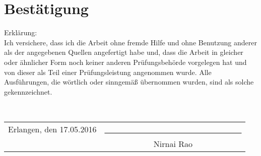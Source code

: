 \chapter*{Best\"atigung}\thispagestyle{empty}
\label{sec:Bestaetigung}

\vspace*{2cm}
Erklärung:
~\\
Ich versichere, dass ich die Arbeit ohne fremde Hilfe und ohne Benutzung anderer als der angegebenen Quellen angefertigt habe und, dass die Arbeit in gleicher oder ähnlicher Form noch keiner anderen Prüfungsbehörde vorgelegen hat und von dieser als Teil einer Prüfungsleistung angenommen wurde. Alle Ausführungen, die wörtlich oder sinngemäß übernommen wurden, sind als solche gekennzeichnet.


\vspace*{2cm}

~\\
\begin{tabular}{lc}
	Erlangen, den 17.05.2016	&	\underline{ \ \ \ \ \ \ \ \ \ \ \ \ \ \ \ \ \ \ \ \ \ \ \ \ \ \ \ \ \ \ \ \ \ \ }\\
												    & \small{Nirnai Rao}\\	
\end{tabular}



